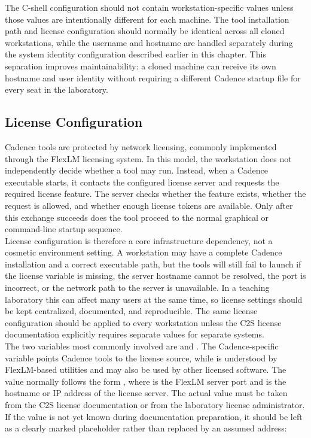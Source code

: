 \noindent The C-shell configuration should not contain workstation-specific values unless those values
are intentionally different for each machine. The tool installation path and license configuration
should normally be identical across all cloned workstations, while the username and hostname are
handled separately during the system identity configuration described earlier in this chapter. This
separation improves maintainability: a cloned machine can receive its own hostname and user identity
without requiring a different Cadence startup file for every seat in the laboratory.

\subsection{License Configuration}

Cadence tools are protected by network licensing, commonly implemented through the FlexLM licensing
system. In this model, the workstation does not independently decide whether a tool may run. Instead,
when a Cadence executable starts, it contacts the configured license server and requests the required
license feature. The server checks whether the feature exists, whether the request is allowed, and
whether enough license tokens are available. Only after this exchange succeeds does the tool proceed
to the normal graphical or command-line startup sequence.\\

\noindent License configuration is therefore a core infrastructure dependency, not a cosmetic
environment setting. A workstation may have a complete Cadence installation and a correct executable
path, but the tools will still fail to launch if the license variable is missing, the server hostname
cannot be resolved, the port is incorrect, or the network path to the server is unavailable. In a
teaching laboratory this can affect many users at the same time, so license settings should be kept
centralized, documented, and reproducible. The same license configuration should be applied to every
workstation unless the C2S license documentation explicitly requires separate values for separate
systems.\\

\noindent The two variables most commonly involved are  and
. The Cadence-specific variable points Cadence tools to the license
source, while  is understood by FlexLM-based utilities and may also be
used by other licensed software. The value normally follows the form
, where  is the FlexLM server port and
 is the hostname or IP address of the license server. The actual value
must be taken from the C2S license documentation or from the laboratory license administrator. If
the value is not yet known during documentation preparation, it should be left as a clearly marked
placeholder rather than replaced by an assumed address:

